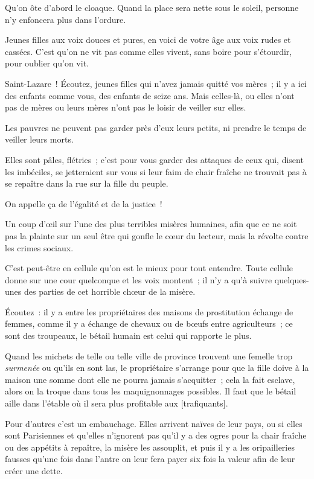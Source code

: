 \documentclass[french,twoside]{book} %
\newcommand\corr[1]{#1}
\begin{document}
Qu’on ôte d’abord le cloaque. Quand la place sera nette sous le soleil, personne n’y enfoncera plus dans l’ordure.\par
Jeunes filles aux voix douces et pures, en voici de votre âge aux voix rudes et cassées. C’est qu’on ne vit pas comme elles vivent, sans boire pour s’étourdir, pour oublier qu’on vit.\par
Saint-Lazare ! Écoutez, jeunes filles qui n’avez jamais quitté vos mères ; il y a ici des enfants comme vous, des enfants de seize ans. Mais celles-là, ou elles n’ont pas de mères ou leurs mères n’ont pas le loisir de veiller sur elles.\par
Les pauvres ne peuvent pas garder près d’eux leurs petits, ni prendre le temps de veiller leurs morts.\par
Elles sont pâles, flétries ; c’est pour vous garder des attaques de ceux qui, disent les imbéciles, se jetteraient sur vous si leur faim de chair fraîche ne trouvait pas à se repaître dans la rue sur la fille du peuple.\par
On appelle ça de l’égalité et de la justice !\par
Un coup d’œil sur l’une des plus terribles misères humaines, afin que ce ne soit pas la plainte  sur un seul être qui gonfle le cœur du lecteur, mais la révolte contre les crimes sociaux.\par
C’est peut-être en cellule qu’on est le mieux pour tout entendre. Toute cellule donne sur une cour quelconque et les voix montent ; il n’y a qu’à suivre quelques-unes des parties de cet horrible chœur de la misère.\par
Écoutez : il y a entre les propriétaires des maisons de prostitution échange de femmes, comme il y a échange de chevaux ou de bœufs entre agriculteurs ; ce sont des troupeaux, le bétail humain est celui qui rapporte le plus.\par
Quand les michets de telle ou telle ville de province trouvent une femelle trop \emph{surmenée} ou qu’ils en sont las, le propriétaire s’arrange pour que la fille doive à la maison une somme dont elle ne pourra jamais s’acquitter ; cela la fait esclave, alors on la troque dans tous les maquignonnages possibles. Il faut que le bétail aille dans l’étable où il sera plus profitable aux [{\corr trafiquants}].\par
Pour d’autres c’est un embauchage. Elles arrivent naïves de leur pays, ou si elles sont Parisiennes et qu’elles n’ignorent pas qu’il y a des ogres pour la chair fraîche ou des appétits à repaître, la misère les assouplit, et puis il y a les oripailleries fausses qu’une fois dans l’antre on  leur fera payer six fois la valeur afin de leur créer une dette.\par
\end{document}
